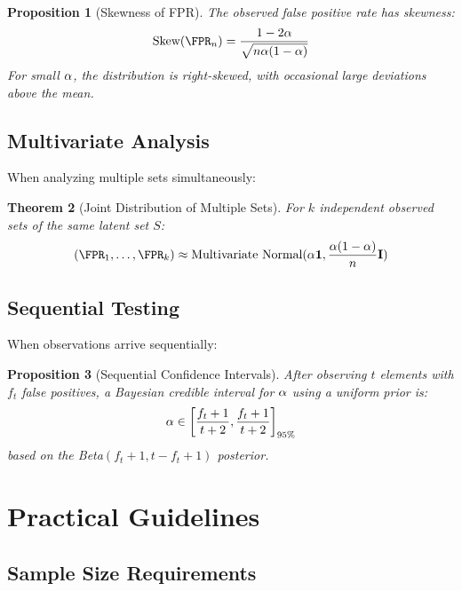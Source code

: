 \documentclass[11pt,final,hidelinks]{article}
\newtheorem{theorem}{Theorem}[section]
\newtheorem{proposition}[theorem]{Proposition}
\begin{document}
\begin{proposition}[Skewness of FPR]
The observed false positive rate has skewness:
\begin{equation}
\text{Skew}(\FPR_n) = \frac{1-2\fprate}{\sqrt{n\fprate(1-\fprate)}}
\end{equation}
For small $\alpha$, the distribution is right-skewed, with occasional large deviations above the mean.
\end{proposition}

\subsection{Multivariate Analysis}

When analyzing multiple sets simultaneously:

\begin{theorem}[Joint Distribution of Multiple Sets]
For $k$ independent observed sets of the same latent set $S$:
\begin{equation}
(\FPR_1, \ldots, \FPR_k) \approx \text{Multivariate Normal}(\fprate \mathbf{1}, \frac{\fprate(1-\fprate)}{n}\mathbf{I})
\end{equation}
\end{theorem}

\subsection{Sequential Testing}

When observations arrive sequentially:

\begin{proposition}[Sequential Confidence Intervals]
After observing $t$ elements with $f_t$ false positives, a Bayesian credible interval for $\alpha$ using a uniform prior is:
\begin{equation}
\alpha \in \left[\frac{f_t + 1}{t + 2}, \frac{f_t + 1}{t + 2}\right]_{95\%}
\end{equation}
based on the Beta$(f_t + 1, t - f_t + 1)$ posterior.
\end{proposition}

\section{Practical Guidelines}

\subsection{Sample Size Requirements}
\end{document}
